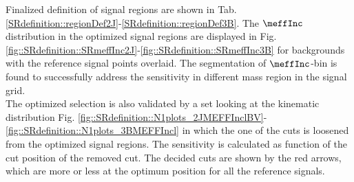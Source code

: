 Finalized definition of signal regions are shown in Tab. \ref{SRdefinition::regionDef2J}-\ref{SRdefinition::regionDef3B}. The $\meffInc$ distribution in the optimized signal regions are displayed in Fig. \ref{fig::SRdefinition::SRmeffInc2J}-\ref{fig::SRdefinition::SRmeffInc3B} for backgrounds with the reference signal points overlaid. The segmentation of $\meffInc$-bin is found to successfully address the sensitivity in different mass region in the signal grid. \\

The optimized selection is also validated by a set looking at the kinematic distribution Fig. \ref{fig::SRdefinition::N1plots_2JMEFFInclBV}-\ref{fig::SRdefinition::N1plots_3BMEFFIncl} in which the one of the cuts is loosened from the optimized signal regions. The sensitivity is calculated as function of the cut position of the removed cut. The decided cuts are shown by the red arrows, which are more or less at the optimum position for all the reference signals.





\clearpage				
